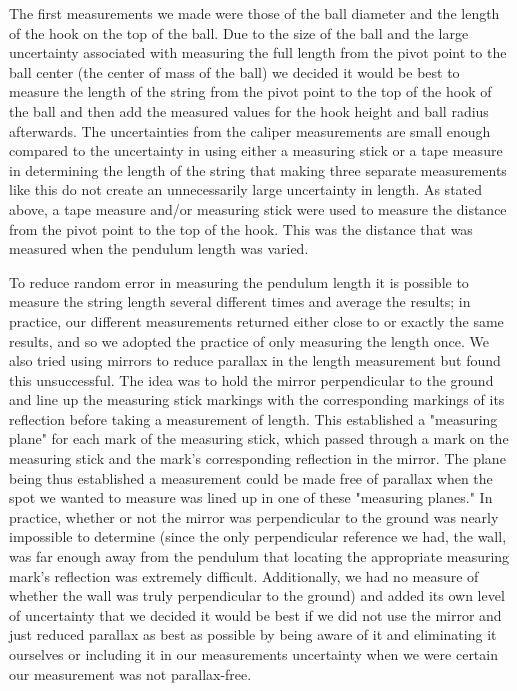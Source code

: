 \documentclass[iop]{emulateapj}
\begin{document}
The first measurements we made were those of the ball diameter and the length 
of the hook on the top of the ball.  Due to the size of 
the ball and the large uncertainty associated with measuring the full length 
from the pivot point to the ball center (the center of mass of the
ball) we decided it would be best to measure the length of the string from the
pivot point to the top of the hook of the ball and then add the measured values 
for the hook height and ball radius afterwards.  The uncertainties from the 
caliper measurements are small enough compared to the uncertainty in using 
either a measuring stick or a tape measure in determining the length of the
string that making three separate measurements like this do not create an 
unnecessarily large uncertainty in length.  As stated above, a tape measure 
and/or measuring stick were used to measure the distance from the pivot point
to the top of the hook.  This was the distance that was measured when the
pendulum length was varied.

To reduce random error in measuring the pendulum length 
it is possible to measure the string length several 
different times and average the results; in practice, our different 
measurements returned either close to or exactly the same results, and so 
we adopted the practice of only measuring the length once. We also tried using 
mirrors to reduce parallax in the length measurement but found this 
unsuccessful.  The idea was to hold the mirror perpendicular to the ground
and line up the measuring stick markings with the corresponding markings 
of its reflection before taking a measurement of length.  This established a 
"measuring plane" for each mark of the measuring stick, which passed through 
a mark on the measuring stick and the mark's corresponding reflection in the 
mirror.  The plane being thus established a measurement could be made free of 
parallax when the spot we wanted to measure was lined up in one of these 
"measuring planes."  In practice, whether or not the mirror was perpendicular 
to the ground was nearly impossible to determine (since the only perpendicular 
reference we had, the wall, was far enough away from the pendulum that 
locating the appropriate measuring mark's reflection was extremely difficult. 
Additionally, we had no measure of whether the wall was truly perpendicular 
to the ground) and added its own level of uncertainty that we decided it would 
be best if we did not use the mirror and just reduced parallax as best as 
possible by being aware of it and eliminating it ourselves or including it in 
our measurements uncertainty when we were certain our measurement was not 
parallax-free.
\end{document}
